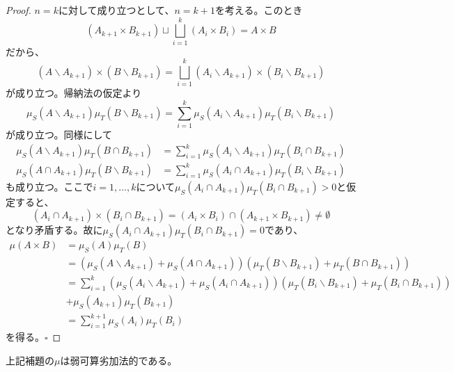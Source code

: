 \documentclass[../root.tex]{subfiles}
\begin{document}
\begin{proof}
$ n=k $に対して成り立つとして、$ n=k+1 $を考える。このとき
\[ ( A_{k+1}\times B_{k+1} )\sqcup\bigsqcup_{i=1}^{k}( A_{i}\times B_{i} )=A\times B \]
だから、
\[ (A\backslash A_{k+1} )\times( B\backslash B_{k+1} )=\bigsqcup_{i=1}^{k}( A_{i}\backslash A_{k+1} )\times( B_{i}\backslash B_{k+1} ) \]
が成り立つ。帰納法の仮定より
\[ \mu_{S}( A\backslash A_{k+1} )\mu_{T}( B\backslash B_{k+1} )=\sum_{i=1}^{k}\mu_{S}( A_{i}\backslash A_{k+1} )\mu_{T}( B_{i}\backslash B_{k+1} ) \]
が成り立つ。同様にして
\begin{align*}
\mu_{S}( A\backslash A_{k+1} )\mu_{T}( B\cap B_{k+1} ) &= \sum_{i=1}^{k}\mu_{S}( A_{i}\backslash A_{k+1} )\mu_{T}( B_{i}\cap B_{k+1} ) \\
\mu_{S}( A\cap A_{k+1} )\mu_{T}( B\backslash B_{k+1} ) &= \sum_{i=1}^{k}\mu_{S}( A_{i}\cap A_{k+1} )\mu_{T}( B_{i}\backslash B_{k+1} )
\end{align*}
も成り立つ。ここで$ i=1, \dotsc, k $について$ \mu_{S}( A_{i}\cap A_{k+1} )\mu_{T}( B_{i}\cap B_{k+1} )\gt 0 $と仮定すると、
\[ ( A_{i}\cap A_{k+1} )\times( B_{i}\cap B_{k+1} )=( A_{i}\times B_{i} )\cap( A_{k+1}\times B_{k+1} )\neq\emptyset \]
となり矛盾する。故に$ \mu_{S}( A_{i}\cap A_{k+1} )\mu_{T}( B_{i}\cap B_{k+1} )=0 $であり、
\begin{align*} \mu( A\times B ) &= \mu_{S}( A )\mu_{T}( B ) \\
&= ( \mu_{S}( A\backslash A_{k+1} )+\mu_{S}( A\cap A_{k+1} ) )( \mu_{T}( B\backslash B_{k+1} )+\mu_{T}( B\cap B_{k+1} ) ) \\
&=\sum_{i=1}^{k}( \mu_{S}( A_{i}\backslash A_{k+1} )+\mu_{S}( A_{i}\cap A_{k+1} ) )( \mu_{T}( B_{i}\backslash B_{k+1} )+\mu_{T}( B_{i}\cap B_{k+1} ) ) \\
&+\mu_{S}( A_{k+1} )\mu_{T}( B_{k+1} ) \\ &= \sum_{i=1}^{k+1}\mu_{S}( A_{i} )\mu_{T}( B_{i} )
\end{align*}
を得る。$ \square $
\end{proof}

\begin{Thm}{}{}
上記補題の$ \mu $は弱可算劣加法的である。
\end{Thm}
\end{document}
